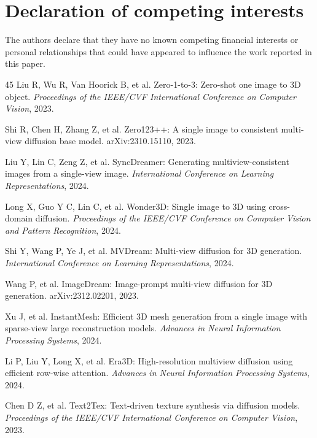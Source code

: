 \documentclass[times,twocolumn,final]{elsarticle}
\providecommand{\DIFaddbegin}{} %
\providecommand{\DIFaddend}{} %
\begin{document}
\section*{Declaration of competing interests}

The authors declare that they have no known competing financial interests or personal relationships that could have appeared to influence the work reported in this paper.


\DIFaddbegin \begingroup
\linespread{0.94}\selectfont
\DIFaddend \begin{thebibliography}{45}
\linespread{0.90}\selectfont\setlength{\itemsep}{-0.6pt}
Liu R, Wu R, Van Hoorick B, et al. Zero-1-to-3: Zero-shot one image to 3D object. \textit{Proceedings of the IEEE/CVF International Conference on Computer Vision}, 2023.

Shi R, Chen H, Zhang Z, et al. Zero123++: A single image to consistent multi-view diffusion base model. arXiv:2310.15110, 2023.

Liu Y, Lin C, Zeng Z, et al. SyncDreamer: Generating multiview-consistent images from a single-view image. \textit{International Conference on Learning Representations}, 2024.

Long X, Guo Y C, Lin C, et al. Wonder3D: Single image to 3D using cross-domain diffusion. \textit{Proceedings of the IEEE/CVF Conference on Computer Vision and Pattern Recognition}, 2024.

Shi Y, Wang P, Ye J, et al. MVDream: Multi-view diffusion for 3D generation. \textit{International Conference on Learning Representations}, 2024.

Wang P, et al. ImageDream: Image-prompt multi-view diffusion for 3D generation. arXiv:2312.02201, 2023.

Xu J, et al. InstantMesh: Efficient 3D mesh generation from a single image with sparse-view large reconstruction models. \textit{Advances in Neural Information Processing Systems}, 2024.

Li P, Liu Y, Long X, et al. Era3D: High-resolution multiview diffusion using efficient row-wise attention. \textit{Advances in Neural Information Processing Systems}, 2024.

Chen D Z, et al. Text2Tex: Text-driven texture synthesis via diffusion models. \textit{Proceedings of the IEEE/CVF International Conference on Computer Vision}, 2023.


\end{thebibliography}
\end{document}
